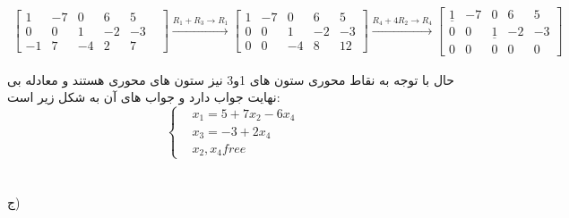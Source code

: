 \documentclass{article}
\begin{document}
\begin{gather*}
\begin{bmatrix}
1&-7&0&6&5\\
0&0&1&-2&-3&\\
-1&7&-4&2&7
\end{bmatrix}\xrightarrow{R_1+R_3\to R_1}
\begin{bmatrix}
1&-7&0&6&5\\
0&0&1&-2&-3\\
0&0&-4&8&12
\end{bmatrix}\xrightarrow{R_4+4R_2\to R_4}
\begin{bmatrix}
\underline{1}&-7&0&6&5\\
0&0&\underline{1}&-2&-3\\
0&0&0&0&0
\end{bmatrix}
\end{gather*}	

حال با توجه به نقاط محوری ستون های 1و3 نیز ستون های محوری هستند و معادله بی نهایت جواب دارد و جواب های آن به شکل زیر است:
\begin{equation*}
\left\{
\begin{array}{rl}
&x_1=5+7x_2-6x_4\\
&x_3=-3+2x_4\\
&x_2,x_4 free
\end{array} \right.
\end{equation*}\\ \\
ج) 
\end{document}
